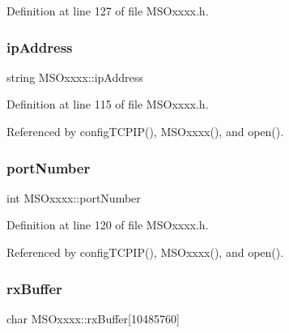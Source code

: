 Definition at line 127 of file M\+S\+Oxxxx.\+h.

\mbox{\label{classMSOxxxx_aa55bdb0feb799b195628fe6ef0222b62}} 
\subsubsection{\texorpdfstring{ip\+Address}{ipAddress}}
{\footnotesize\ttfamily string M\+S\+Oxxxx\+::ip\+Address\hspace{0.3cm}{\ttfamily [private]}}



Definition at line 115 of file M\+S\+Oxxxx.\+h.



Referenced by config\+T\+C\+P\+I\+P(), M\+S\+Oxxxx(), and open().

\mbox{\label{classMSOxxxx_a242bcf72c701cd20d86d25315fc6180f}} 
\subsubsection{\texorpdfstring{port\+Number}{portNumber}}
{\footnotesize\ttfamily int M\+S\+Oxxxx\+::port\+Number\hspace{0.3cm}{\ttfamily [private]}}



Definition at line 120 of file M\+S\+Oxxxx.\+h.



Referenced by config\+T\+C\+P\+I\+P(), M\+S\+Oxxxx(), and open().

\mbox{\label{classMSOxxxx_a1a50770759caada18087ca8ffb96f357}} 
\subsubsection{\texorpdfstring{rx\+Buffer}{rxBuffer}}
{\footnotesize\ttfamily char M\+S\+Oxxxx\+::rx\+Buffer\mbox{[}10485760\mbox{]}\hspace{0.3cm}{\ttfamily [private]}}




